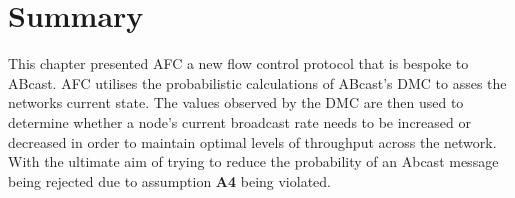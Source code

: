 \section{Summary}
This chapter presented AFC a new flow control protocol that is bespoke to \textsf{ABcast}.  AFC utilises the probabilistic calculations of \textsf{ABcast}'s DMC to asses the networks current state.  The values observed by the DMC are then used to determine whether a node's current broadcast rate needs to be increased or decreased in order to maintain optimal levels of throughput across the network.  With the ultimate aim of trying to reduce the probability of an \textsf{Abcast} message being rejected due to assumption \textbf{A4} being violated.    